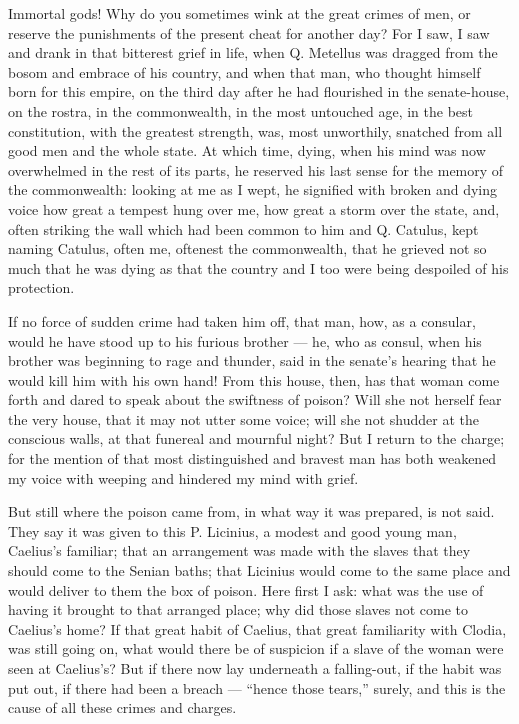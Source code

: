  Immortal gods! Why do you sometimes wink at the great crimes of men, or reserve the punishments of the present cheat for another day? For I saw, I saw and drank in that bitterest grief in life, when Q. Metellus was dragged from the bosom and embrace of his country, and when that man, who thought himself born for this empire, on the third day after he had flourished in the senate-house, on the rostra, in the commonwealth, in the most untouched age, in the best constitution, with the greatest strength, was, most unworthily, snatched from all good men and the whole state. At which time, dying, when his mind was now overwhelmed in the rest of its parts, he reserved his last sense for the memory of the commonwealth: looking at me as I wept, he signified with broken and dying voice how great a tempest hung over me, how great a storm over the state, and, often striking the wall which had been common to him and Q. Catulus, kept naming Catulus, often me, oftenest the commonwealth, that he grieved not so much that he was dying as that the country and I too were being despoiled of his protection.

 If no force of sudden crime had taken him off, that man, how, as a consular, would he have stood up to his furious brother --- he, who as consul, when his brother was beginning to rage and thunder, said in the senate's hearing that he would kill him with his own hand! From this house, then, has that woman come forth and dared to speak about the swiftness of poison? Will she not herself fear the very house, that it may not utter some voice; will she not shudder at the conscious walls, at that funereal and mournful night? But I return to the charge; for the mention of that most distinguished and bravest man has both weakened my voice with weeping and hindered my mind with grief.

 But still where the poison came from, in what way it was prepared, is not said. They say it was given to this P. Licinius, a modest and good young man, Caelius's familiar; that an arrangement was made with the slaves that they should come to the Senian baths; that Licinius would come to the same place and would deliver to them the box of poison. Here first I ask: what was the use of having it brought to that arranged place; why did those slaves not come to Caelius's home? If that great habit of Caelius, that great familiarity with Clodia, was still going on, what would there be of suspicion if a slave of the woman were seen at Caelius's? But if there now lay underneath a falling-out, if the habit was put out, if there had been a breach --- ``hence those tears,'' surely, and this is the cause of all these crimes and charges.

